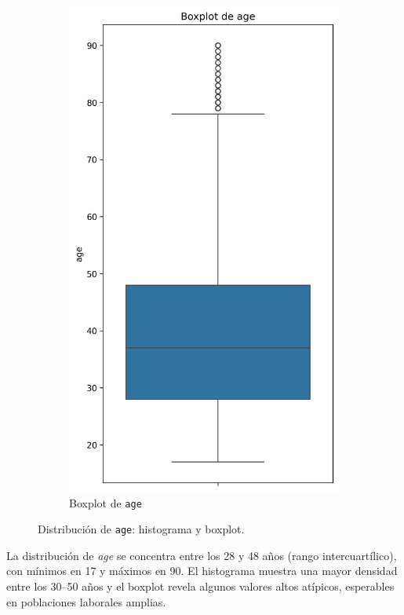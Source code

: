 \documentclass[12pt,a4paper]{article}
\begin{document}
\begin{enumerate}
\begin{figure}[H]
\begin{subfigure}[b]{0.45\textwidth}
        \includegraphics[width=\textwidth]{boxplot_age.png}
        \caption{Boxplot de \texttt{age}}
        \label{fig:age_boxplot}
      \end{subfigure}
      \caption{Distribución de \texttt{age}: histograma y boxplot.}
      \label{fig:age_visual}
    \end{figure}

    La distribución de \emph{age} se concentra entre los 28 y 48 años (rango intercuartílico), con mínimos en 17 
    y máximos en 90. El histograma muestra una mayor densidad entre los 30–50 años y el boxplot revela algunos 
    valores altos atípicos, esperables en poblaciones laborales amplias.


\end{enumerate}
\end{document}
